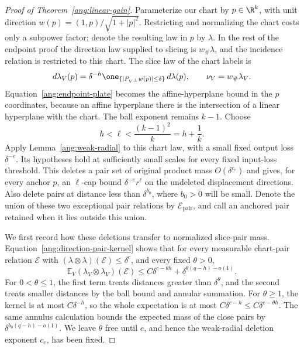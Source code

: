 \documentclass[11pt,reqno]{amsart}
\begin{document}
\begin{proof}[Proof of Theorem~\ref{ang:linear-gain}]
Parameterize our chart by $p\in\R^k$, with unit direction
$w(p)=(1,p)/\sqrt{1+|p|^2}$. Restricting and normalizing the chart
costs only a subpower factor; denote the resulting law in $p$ by
$\lambda$. In the rest of the endpoint proof the direction law supplied
to slicing is $w_\#\lambda$, and the incidence relation is restricted to
this chart. The slice law of the chart labels is
\[
 d\lambda_V(p)=\delta^{-h}
 \one_{\{|P_{V^\perp}w(p)|\le\delta\}}\,d\lambda(p),
 \qquad \nu_V=w_\#\lambda_V.
\]
Equation~\eqref{ang:endpoint-plate}
becomes the affine-hyperplane bound in the $p$ coordinates, because
an affine hyperplane there is the intersection of a linear hyperplane
with the chart. The ball exponent remains $k-1$. Choose
\[
 h<\ell<\frac{(k-1)^2}{k}=h+\frac1k.
\]
Apply Lemma~\ref{ang:weak-radial} to this chart law, with a small
fixed output loss $\delta^{-e}$. Its hypotheses hold at sufficiently
small scales for every fixed input-loss threshold. This deletes a
pair set of original product mass $O(\delta^{c_e})$ and gives, for
every anchor $p$, an $\ell$-cap bound $\delta^{-e}r^\ell$ on
the undeleted displacement directions. Also delete pairs at distance
less than $\delta^{b_0}$, where $b_0>0$ will be small. Denote the union
of these two exceptional pair relations by $\mathcal E_{\mathrm{pair}}$,
and call an anchored pair retained when it lies outside this union.

We first record how these deletions transfer to normalized slice-pair
mass. Equation~\eqref{ang:direction-pair-kernel}
shows that for every measurable chart-pair relation $\mathcal E$ with
$(\lambda\otimes\lambda)(\mathcal E)\le\delta^c$, and every fixed
$\theta>0$,
\begin{equation}\label{ang:exceptional-pair-transfer}
 \mathbb E_V(\lambda_V\otimes\lambda_V)(\mathcal E)
 \le C\delta^{c-\theta h}
       +\delta^{\theta(q-h)-o(1)}.
\end{equation}
For $0<\theta\le1$, the first term treats distances greater than
$\delta^\theta$, and the second treats smaller distances by the ball
bound and annular summation. For $\theta\ge1$, the kernel is at most
$C\delta^{-h}$, so the whole expectation is at most
$C\delta^{c-h}\le C\delta^{c-\theta h}$. The same annulus calculation
bounds the expected mass of the close pairs by
$\delta^{b_0(q-h)-o(1)}$. We leave $\theta$ free until $e$, and hence
the weak-radial deletion exponent $c_e$, has been fixed.


\end{proof}
\end{document}
